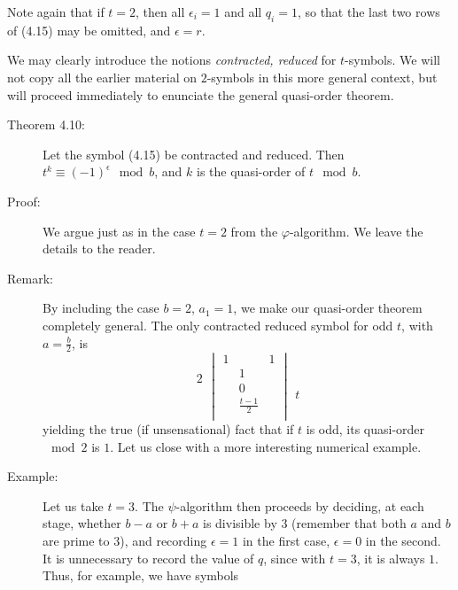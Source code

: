 Note again that if $t = 2$, then all $\epsilon_{i} = 1$ and all $q_{i} = 1$, so that the last two rows of (4.15) may be omitted, and $\epsilon = r$.

We may clearly introduce the notions \emph{contracted, reduced} for $t$-symbols. We will not copy all the earlier material on $2$-symbols in this more general context, but will proceed immediately to enunciate the general quasi-order theorem.

\begin{description}

  \item[Theorem 4.10:] Let the symbol (4.15) be contracted and reduced. Then $t^{k} \equiv (-1)^{\epsilon} \mod{b}$, and $k$ is the quasi-order of $t \mod{b}$.

  \item[Proof:] We argue just as in the case $t = 2$ from the $\varphi$-algorithm. We leave the details to the reader.

  \item[Remark:] By including the case $b = 2$, $a_{1} = 1$, we make our quasi-order theorem completely general. The only contracted reduced symbol for odd $t$, with $a = \frac{b}{2}$, is
    \begin{equation*}
    \begin{array}{c}
    2 \\
    \ \\
    \ \\
    \ 
    \end{array}
    \begin{vmatrix}
    1 &   & 1 \\
      & 1 &   \\
      & 0 &   \\
      & \frac{t-1}{2} & \\
    \end{vmatrix}
    \begin{array}{c}
    \ \\
    \ \\
    \ \\
    t
    \end{array}
    \end{equation*}
    yielding the true (if unsensational) fact that if $t$ is odd, its quasi-order $\mod{2}$ is $1$. Let us close with a more interesting numerical example.

  \item[Example:] Let us take $t = 3$. The $\psi$-algorithm then proceeds by deciding, at each stage, whether $b-a$ or $b+a$ is divisible by $3$ (remember that both $a$ and $b$ are prime to $3$), and recording $\epsilon = 1$ in the first case, $\epsilon = 0$ in the second. It is unnecessary to record the value of $q$, since with $t = 3$, it is always $1$. Thus, for example, we have symbols
\end{description}
